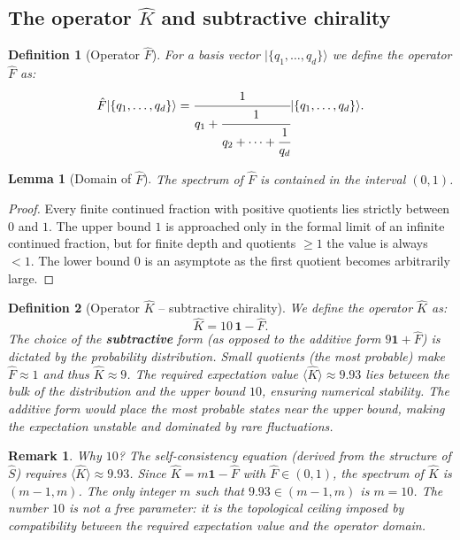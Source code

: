 \documentclass[12pt]{article}
\newtheorem{definition}{Definition}
\newtheorem{lemma}{Lemma}
\newtheorem{remark}{Remark}
\begin{document}
\subsection{The operator $\hat K$ and subtractive chirality}

\begin{definition}[Operator $\hat F$]
For a basis vector $|\{q_1,\dots,q_d\}\rangle$ we define the operator $\hat F$ as:
\[
\hat F |\{q_1,\dots,q_d\}\rangle = \cfrac{1}{q_1 + \cfrac{1}{q_2 + \dots + \cfrac{1}{q_d}}} |\{q_1,\dots,q_d\}\rangle.
\]
\end{definition}

\begin{lemma}[Domain of $\hat F$]
The spectrum of $\hat F$ is contained in the interval $(0,1)$.
\end{lemma}

\begin{proof}
Every finite continued fraction with positive quotients lies strictly between $0$ and $1$. The upper bound $1$ is approached only in the formal limit of an infinite continued fraction, but for finite depth and quotients $\ge 1$ the value is always $<1$. The lower bound $0$ is an asymptote as the first quotient becomes arbitrarily large.
\end{proof}

\begin{definition}[Operator $\hat K$ – subtractive chirality]
We define the operator $\hat K$ as:
\[
\hat K = 10\,\mathbf{1} - \hat F.
\]
The choice of the \textbf{subtractive} form (as opposed to the additive form $9\mathbf{1}+\hat F$) is dictated by the probability distribution. Small quotients (the most probable) make $\hat F \approx 1$ and thus $\hat K \approx 9$. The required expectation value $\langle \hat K \rangle \approx 9.93$ lies between the bulk of the distribution and the upper bound $10$, ensuring numerical stability. The additive form would place the most probable states near the upper bound, making the expectation unstable and dominated by rare fluctuations.
\end{definition}

\begin{remark}
Why $10$? The self-consistency equation (derived from the structure of $\hat S$) requires $\langle \hat K \rangle \approx 9.93$. Since $\hat K = m\mathbf{1} - \hat F$ with $\hat F \in (0,1)$, the spectrum of $\hat K$ is $(m-1, m)$. The only integer $m$ such that $9.93 \in (m-1, m)$ is $m=10$. The number $10$ is not a free parameter: it is the topological ceiling imposed by compatibility between the required expectation value and the operator domain.
\end{remark}
\end{document}

